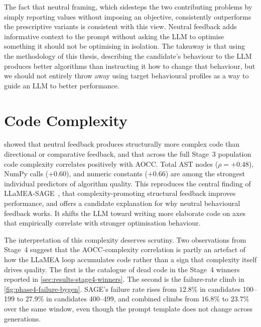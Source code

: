 The fact that neutral framing, which sidesteps the two contributing problems by simply reporting values without imposing an objective, consistently outperforms the prescriptive variants is consistent with this view. Neutral feedback adds informative context to the prompt without asking the LLM to optimise something it should not be optimising in isolation. The takeaway is that using the methodology of this thesis, describing the candidate's behaviour to the LLM produces better algorithms than instructing it how to change that behaviour, but we should not entirely throw away using target behavioural profiles as a way to guide an LLM to better performance.

\section{Code Complexity}
\label{sec:discussion-complexity}

 showed that neutral feedback produces structurally more complex code than directional or comparative feedback, and that across the full Stage~3 population code complexity correlates positively with AOCC. Total AST nodes ($\rho = +0.48$), NumPy calls ($+0.60$), and numeric constants ($+0.66$) are among the strongest individual predictors of algorithm quality. This reproduces the central finding of LLaMEA-SAGE~\cite{vanStein2026LLaMEASAGE}, that complexity-promoting structural feedback improves performance, and offers a candidate explanation for why neutral behavioural feedback works. It shifts the LLM toward writing more elaborate code on axes that empirically correlate with stronger optimisation behaviour.

The interpretation of this complexity deserves scrutiny. Two observations from Stage~4 suggest that the AOCC-complexity correlation is partly an artefact of how the LLaMEA loop accumulates code rather than a sign that complexity itself drives quality. The first is the catalogue of dead code in the Stage~4 winners reported in \cref{sec:results-stage4-winners}. The second is the failure-rate climb in \cref{fig:phase4-failure-bygen}. SAGE's failure rate rises from $12.8\%$ in candidates 100--199 to $27.9\%$ in candidates 400--499, and combined climbs from $16.8\%$ to $23.7\%$ over the same window, even though the prompt template does not change across generations.

